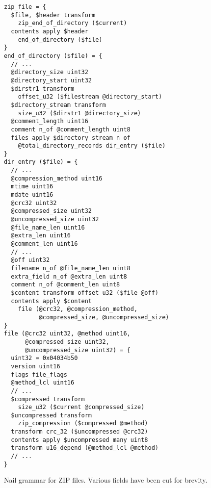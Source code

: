 \begin{figure}
\smaller[0.5]
\begin{verbatim}
zip_file = { 
  $file, $header transform 
    zip_end_of_directory ($current)
  contents apply $header
    end_of_directory ($file)
}
end_of_directory ($file) = {
  // ...
  @directory_size uint32 
  @directory_start uint32
  $dirstr1 transform
    offset_u32 ($filestream @directory_start)
  $directory_stream transform
    size_u32 ($dirstr1 @directory_size)
  @comment_length uint16
  comment n_of @comment_length uint8
  files apply $directory_stream n_of 
    @total_directory_records dir_entry ($file)
}
dir_entry ($file) = {
  // ...
  @compression_method uint16      
  mtime uint16
  mdate uint16
  @crc32 uint32
  @compressed_size uint32
  @uncompressed_size uint32
  @file_name_len uint16
  @extra_len uint16
  @comment_len uint16
  // ...
  @off uint32
  filename n_of @file_name_len uint8
  extra_field n_of @extra_len uint8
  comment n_of @comment_len uint8
  $content transform offset_u32 ($file @off)
  contents apply $content
    file (@crc32, @compression_method,
          @compressed_size, @uncompressed_size)
}
file (@crc32 uint32, @method uint16,
      @compressed_size uint32,
      @uncompressed_size uint32) = {
  uint32 = 0x04034b50
  version uint16
  flags file_flags
  @method_lcl uint16
  // ...
  $compressed transform
    size_u32 ($current @compressed_size)
  $uncompressed transform
    zip_compression ($compressed @method)
  transform crc_32 ($uncompressed @crc32)
  contents apply $uncompressed many uint8
  transform u16_depend (@method_lcl @method)
  // ...
}
\end{verbatim}
\caption{Nail grammar for ZIP files. Various fields have been cut for brevity.}
\label{fig:zip-extract}
\end{figure}
